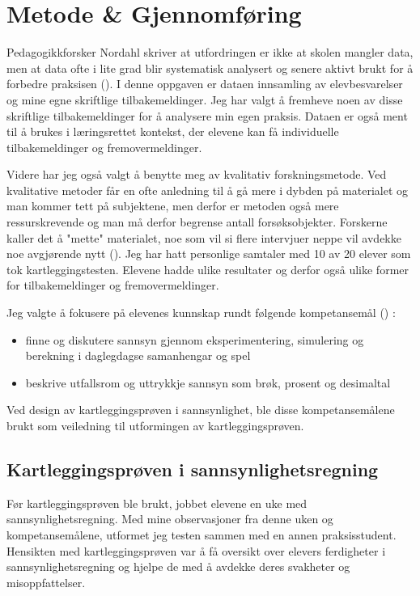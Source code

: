 \documentclass[main.tex]{subfiles}
\begin{document}
\section*{Metode \& Gjennomføring}
\label{sec:2}

Pedagogikkforsker Nordahl skriver at utfordringen er ikke at skolen mangler data, men at data ofte i lite grad blir
systematisk analysert og senere aktivt brukt for å forbedre praksisen ().
I denne oppgaven er dataen innsamling av elevbesvarelser og mine egne skriftlige tilbakemeldinger.
Jeg har valgt å fremheve noen av disse skriftlige tilbakemeldinger for å analysere min egen praksis.
Dataen er også ment til å brukes i læringsrettet kontekst, der elevene kan få individuelle 
tilbakemeldinger og fremovermeldinger. 

Videre har jeg også valgt å benytte meg av kvalitativ forskningsmetode. Ved kvalitative metoder 
får en ofte anledning til å gå mere i dybden på materialet og man kommer tett på subjektene, men derfor er metoden også 
mere ressurskrevende og man må derfor begrense antall forsøksobjekter. Forskerne kaller det å "mette" materialet, noe som 
vil si flere intervjuer neppe vil avdekke noe avgjørende nytt (). Jeg har hatt personlige samtaler med 10 
av 20 elever som tok kartleggingstesten. Elevene hadde ulike resultater og derfor også ulike former for tilbakemeldinger 
og fremovermeldinger.

Jeg valgte å fokusere på elevenes kunnskap rundt følgende kompetansemål \newline
() :
\begin{itemize}
\item finne og diskutere sannsyn gjennom eksperimentering, simulering og berekning i daglegdagse samanhengar og spel
\item beskrive utfallsrom og uttrykkje sannsyn som brøk, prosent og desimaltal
\end{itemize}
Ved design av kartleggingsprøven i sannsynlighet, ble disse kompetansemålene brukt som veiledning til utformingen av 
kartleggingsprøven.

\subsection*{Kartleggingsprøven i sannsynlighetsregning}

Før kartleggingsprøven ble brukt, jobbet elevene en uke med sannsynlighetsregning. Med mine observasjoner fra denne uken 
og kompetansemålene, utformet jeg testen sammen med en annen praksisstudent. Hensikten med kartleggingsprøven 
var å få oversikt over elevers ferdigheter i sannsynlighetsregning og hjelpe de med å avdekke deres
svakheter og misoppfattelser.
\end{document}
